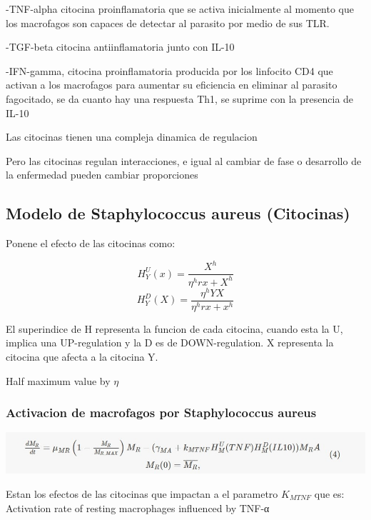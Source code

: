 \documentclass[
]{article}
\begin{document}
-TNF-alpha citocina proinflamatoria que se activa inicialmente al
momento que los macrofagos son capaces de detectar al parasito por medio
de sus TLR.

-TGF-beta citocina antiinflamatoria junto con IL-10

-IFN-gamma, citocina proinflamatoria producida por los linfocito CD4 que
activan a los macrofagos para aumentar su eficiencia en eliminar al
parasito fagocitado, se da cuanto hay una respuesta Th1, se suprime con
la presencia de IL-10

Las citocinas tienen una compleja dinamica de regulacion

Pero las citocinas regulan interacciones, e igual al cambiar de fase o
desarrollo de la enfermedad pueden cambiar proporciones

\hypertarget{modelo-de-staphylococcus-aureus-citocinas}{%
\subsection{Modelo de Staphylococcus aureus
(Citocinas)}\label{modelo-de-staphylococcus-aureus-citocinas}}

Ponene el efecto de las citocinas como:

\[ H_{Y}^U(x)= \dfrac{X^{h}}{\eta ^{h}rx + X^{h}} \]
\[ H_{Y}^{D}(X)= \dfrac{\eta ^{h}YX}{\eta ^{h}rx + x^{h}} \]

El superindice de H representa la funcion de cada citocina, cuando esta
la U, implica una UP-regulation y la D es de DOWN-regulation. X
representa la citocina que afecta a la citocina Y.

Half maximum value by \(\eta\)

\hypertarget{activacion-de-macrofagos-por-staphylococcus-aureus}{%
\subsubsection{Activacion de macrofagos por Staphylococcus
aureus}\label{activacion-de-macrofagos-por-staphylococcus-aureus}}

\includegraphics{images/397ab830-736c-47a6-881a-0279fd5025aa-01.jpg}

Estan los efectos de las citocinas que impactan a el parametro
\(K_{MTNF}\) que es: Activation rate of resting macrophages influenced
by TNF-α
\end{document}
